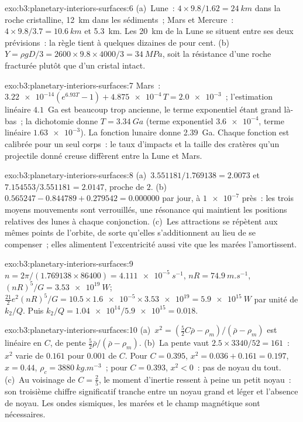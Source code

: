 \begin{solution}{exo:b3:planetary-interiors-surfaces:6}
(a)~Lune~: $4\times9.8/1.62 = \qty{24}{km}$ dans la roche cristalline,
\qty{12}{km} dans les sédiments~; Mars et Mercure~: $4\times9.8/3.7 =
\qty{10.6}{km}$ et \qty{5.3}{km}. Les \qty{20}{km} de la Lune se situent entre
ses deux prévisions~: la règle tient à quelques dizaines de pour cent. (b)~$Y =
\rho gD/3 = 2600\times9.8\times4000/3 = \qty{34}{MPa}$, soit la résistance
d'une roche fracturée plutôt que d'un cristal intact.
\end{solution}

\begin{solution}{exo:b3:planetary-interiors-surfaces:7}
Mars~: $\num{3.22e-14}(e^{6.93T} - 1) + \num{4.875e-4}\,T = \num{2.0e-3}$~;
l'estimation linéaire $4.1$~Ga est beaucoup trop ancienne, le terme exponentiel étant grand
là-bas~; la dichotomie donne $T = \qty{3.34}{Ga}$ (terme exponentiel
$\num{3.6e-4}$, terme linéaire $\num{1.63e-3}$). La fonction lunaire donne
\qty{2.39}{Ga}. Chaque fonction est calibrée pour un seul corps~: le taux
d'impacts et la taille des cratères qu'un projectile donné creuse diffèrent
entre la Lune et Mars.
\end{solution}

\begin{solution}{exo:b3:planetary-interiors-surfaces:8}
(a)~$3.551181/1.769138 = 2.0073$ et $7.154553/3.551181 = 2.0147$, proche de
$2$. (b)~$0.565247 - 0.844789 + 0.279542 = 0.000000$ par jour, à
$\num{1e-7}$ près~: les trois moyens mouvements sont verrouillés, une résonance qui maintient
les positions relatives des lunes à chaque conjonction. (c)~Les attractions se répètent
aux mêmes points de l'orbite, de sorte qu'elles s'additionnent au lieu de se compenser~;
elles alimentent l'excentricité aussi vite que les marées l'amortissent.
\end{solution}

\begin{solution}{exo:b3:planetary-interiors-surfaces:9}
$n = 2\pi/(1.769138\times86400) = \qty{4.111e-5}{s^{-1}}$, $nR =
\qty{74.9}{m.s^{-1}}$, $(nR)^5/G = \qty{3.53e19}{W}$;
$\tfrac{21}{2}e^2(nR)^5/G = 10.5\times\num{1.6e-5}\times\num{3.53e19} =
\qty{5.9e15}{W}$ par unité de $k_2/Q$. Puis $k_2/Q =
\num{1.04e14}/\num{5.9e15} = 0.018$.
\end{solution}

\begin{solution}{exo:b3:planetary-interiors-surfaces:10}
(a)~$x^2 = (\tfrac52C\bar\rho - \rho_m)/(\bar\rho - \rho_m)$ est linéaire en
$C$, de pente $\tfrac52\bar\rho/(\bar\rho - \rho_m)$. (b)~La pente vaut
$2.5\times3340/52 = 161$~: $x^2$ varie de $0.161$ pour $0.001$ de $C$.
Pour $C = 0.395$, $x^2 = 0.036 + 0.161 = 0.197$, $x = 0.44$, $\rho_c =
\qty{3880}{kg.m^{-3}}$~; pour $C = 0.393$, $x^2 < 0$~: pas de noyau du tout.
(c)~Au voisinage de $C = \tfrac25$, le moment d'inertie ressent à peine un petit noyau~:
son troisième chiffre significatif tranche entre un noyau grand et léger et l'absence de noyau.
Les ondes sismiques, les marées et le champ magnétique sont nécessaires.
\end{solution}

